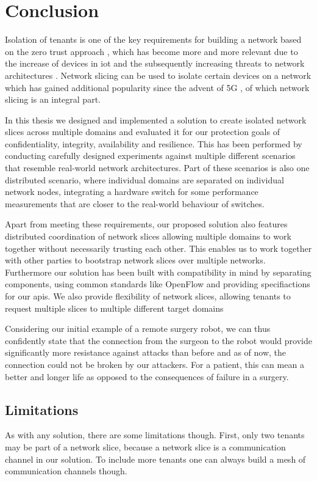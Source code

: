 \chapter{Conclusion}
\label{conclusion}

Isolation of tenants is one of the key requirements for building a network based on the zero trust approach \cite{zerotrust}, which has become more and more relevant due to the increase of devices in \acrshort{iot} \cite{iotincrease} and the subsequently increasing threats to network architectures \cite{iotthreats}. Network slicing can be used to isolate certain devices on a network which has gained additional popularity since the advent of 5G \cite{5G1, 5G2, 5G3}, of which network slicing is an integral part.

In this thesis we designed and implemented a solution to create isolated network slices across multiple domains and evaluated it for our protection goals of confidentiality, integrity, availability and resilience. This has been performed by conducting carefully designed experiments against multiple different scenarios that resemble real-world network architectures. Part of these scenarios is also one distributed scenario, where individual domains are separated on individual network nodes, integrating a hardware switch for some performance measurements that are closer to the real-world behaviour of switches.

Apart from meeting these requirements, our proposed solution also features distributed coordination of network slices allowing multiple domains to work together without necessarily trusting each other. This enables us to work together with other parties to bootstrap network  slices over multiple networks. Furthermore our solution has been built with compatibility in mind by separating components, using common standards like OpenFlow and providing specifiactions for our \acrshort{api}s. We also provide flexibility of network slices, allowing tenants to request multiple slices to multiple different target domains

Considering our initial example of a remote surgery robot, we can thus confidently state that the connection from the surgeon to the robot would provide significantly more resistance against attacks than before and as of now, the connection could not be broken by our attackers. For a patient, this can mean a better and longer life as opposed to the consequences of failure in a surgery.

\section{Limitations}
As with any solution, there are some limitations though. First, only two tenants may be part of a network slice, because a network slice is a communication channel in our solution. To include more tenants one can always build a mesh of communication channels though.

